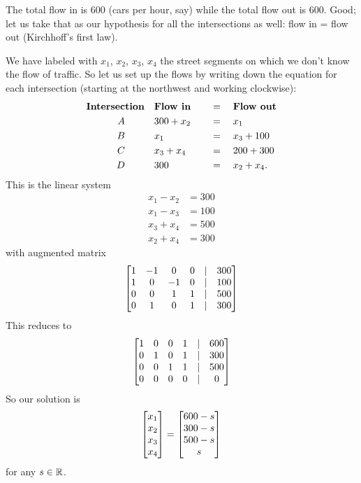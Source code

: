 \begin{myprob}
\begin{mysol}
\begin{center}
{\begin{picture}
\end{picture}}\end{center}



The total flow in is $600$ (cars per hour, say) while
the total flow out is $600$.  Good; let us take that
as our hypothesis for all the intersections as well:
flow in  = flow out  (Kirchhoff's first law).

We have labeled with $x_1$, $x_2$, $x_3$, $x_4$ 
the street segments on which we don't know the flow
of traffic.  So let us set up the flows by writing
down the equation for each intersection (starting
at the northwest and working clockwise):
\begin{alignat*}{2}
\text{\bf Intersection}\quad& \text{\bf Flow in}\quad&&=\quad\text{\bf Flow out}\\
A\qquad \quad&300+x_2 &&=\quad x_1\\
B\qquad \quad &x_1 &&=\quad x_3+100\\
C\qquad \quad &x_3+x_4 &&=\quad 200 + 300\\
D\qquad \quad &300 &&=\quad x_2+x_4.
\end{alignat*}
This is the linear system
\begin{align*}
x_1-x_2 &= 300\\
x_1-x_3 &= 100\\
x_3+x_4 &= 500\\
x_2+x_4 &= 300
\end{align*}
with augmented matrix
$$
\mat{
1 & -1 & 0 & 0 & |& 300\\
1 & 0 & -1 & 0 & |& 100\\
0 & 0 & 1 & 1  &|& 500\\
0 & 1 & 0 & 1  &|& 300}
$$ 
This reduces to
$$
\mat{
1 & 0 & 0 & 1 & |& 600\\
0 & 1 & 0 & 1 & |& 300\\
0 & 0 & 1 & 1  &|& 500\\
0 & 0 & 0 & 0  &|& 0}
$$
So our solution is
$$
\mat{x_1\\x_2\\x_3\\x_4} = \mat{600-s\\300-s\\500-s\\s}
$$
for any $s\in \R$.


\end{mysol}
\end{myprob}
